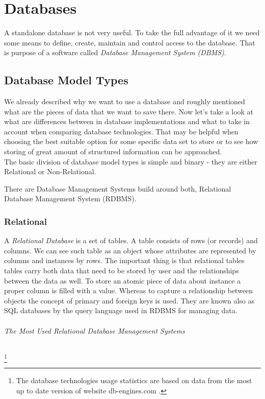 \chapter{Databases}

A standalone database is not very useful. To take the full advantage of it we need some means to define, create, maintain and control access to the database. That is purpose of a software called \textit{Database Management System (DBMS)}.

\section{Database Model Types}

We already described why we want to use a database and roughly mentioned what are the pieces of data that we want to save there. 
Now let's take a look at what are differences between in database implementations and what to take in account when comparing database technologies.
That may be helpful when choosing the best suitable option for some specific data set to store or to see how storing of great amount of structured information can be approached. \\ 

The basic division of database model types is simple and binary - they are either Relational or Non-Relational.

There are Database Management Systems build around both, Relational Database Management System (RDBMS).


\subsection{Relational}
A \textit{Relational Database} is a set of tables. A table consists of rows (or records) and columns. We can see such table as an object whose attributes are represented by columns and instances by rows. 
The important thing is that relational tables tables carry both data that need to be stored by user and the relationships between the data as well. 
To store an atomic piece of data about instance a proper column is filled with a value.
Whereas to capture a relationship between objects the concept of primary and foreign keys is used.
They are known also as SQL databases by the query language used in RDBMS for managing data.


\subparagraph{The Most Used Relational Database Management Systems} \footnote{The database technologies usage statistics are based on data from the most up to date version of website db-engines.com \cite{DatabaseEnginesStatistics19}.}

